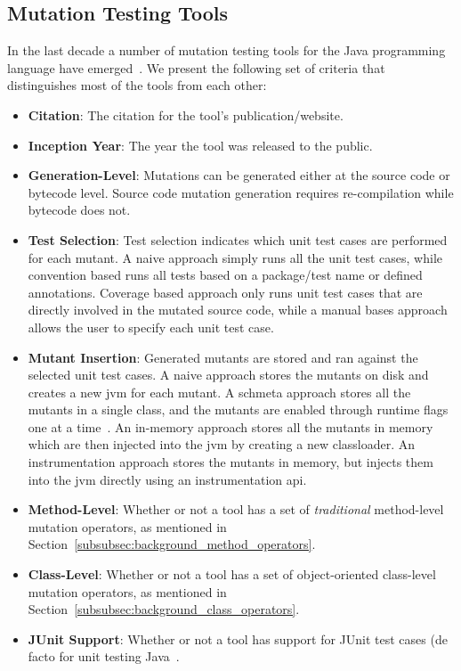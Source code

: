 \subsection{Mutation Testing Tools}
\label{subsec:background_mutation_tools}
In the last decade a number of mutation testing tools for the Java programming language have emerged~\cite{JH10}. We present the following set of criteria that distinguishes most of the tools from each other:

\begin{itemize}
  \item \textbf{Citation}: The citation for the tool's publication/website.
  \item \textbf{Inception Year}: The year the tool was released to the public.
  \item \textbf{Generation-Level}: Mutations can be generated either at the source code or bytecode level. Source code mutation generation requires re-compilation while bytecode does not.
  \item \textbf{Test Selection}: Test selection indicates which unit test cases are performed for each mutant. A naive approach simply runs all the unit test cases, while convention based runs all tests based on a package/test name or defined annotations. Coverage based approach only runs unit test cases that are directly involved in the mutated source code, while a manual bases approach allows the user to specify each unit test case.
  \item \textbf{Mutant Insertion}: Generated mutants are stored and ran against the selected unit test cases. A naive approach stores the mutants on disk and creates a new \gls{jvm} for each mutant. A schmeta approach stores all the mutants in a single class, and the mutants are enabled through runtime flags one at a time~\cite{UOH93}. An in-memory approach stores all the mutants in memory which are then injected into the \gls{jvm} by creating a new classloader. An instrumentation approach stores the mutants in memory, but injects them into the \gls{jvm} directly using an instrumentation \gls{api}.
  \item \textbf{Method-Level}: Whether or not a tool has a set of \emph{traditional} method-level mutation operators, as mentioned in Section~\ref{subsubsec:background_method_operators}.
  \item \textbf{Class-Level}: Whether or not a tool has a set of object-oriented class-level mutation operators, as mentioned in Section~\ref{subsubsec:background_class_operators}.
  \item \textbf{JUnit Support}: Whether or not a tool has support for JUnit test cases (de facto for unit testing Java~\cite{JUnit}.

\end{itemize}
